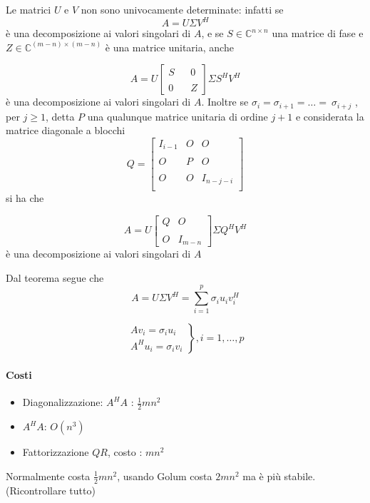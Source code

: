 \begin{thproof}
Le matrici $U$ e $V$ non sono univocamente determinate: infatti se
$$ A = U \Sigma V^{H}$$
\`e una decomposizione ai valori singolari di $A$, e se $S \in
\mathbb{C}^{n \times n}$ una matrice di fase e $Z \in
\mathbb{C}^{(m-n) \times (m-n)}$ \`e una matrice unitaria, anche

$$
A = U \left[
\begin{array}{ccc} S & & 0\\ & & \\ 0 & & Z
\end{array} \right] \Sigma S^{H}V^{H}
$$
\`e una decomposizione ai valori singolari di $A$.  Inoltre se
$\sigma_i = \sigma_{i+1} = \ldots = \ \sigma_{i+j}$ , per $j \geq 1$,
detta $P$ una qualunque matrice unitaria di ordine $j + 1$ e
considerata la matrice diagonale a blocchi
$$
Q= \left[
\begin{array}{ccc} I_{i-1} & O & O \\ & & \\ O & P & O \\ & & \\ O & O
& I_{n-j-i} \\
\end{array} \right]
$$
si ha che

$$
A= U \left[
\begin{array}{cc} Q & O \\ & \\ O & I_{m-n}
\end{array} \right] \Sigma Q^{H}V^{H}
$$
\`e una decomposizione ai valori singolari di $A$
\end{thproof} Dal teorema segue che
\begin{equation}
  \label{eq:06minq13} A = U\Sigma V^{H} = \displaystyle \sum_{i=1}^{p}
\sigma_i u_i v_i^{H}
\end{equation}

$$
\left.
\begin{array}{c} Av_i = \sigma_i u_i \\ A^{H} u_i = \sigma_i v_i
\end{array} \right\}, i=1,\ldots, p
$$
\begin{workinprogress}
\paragraph{Costi}
\begin{itemize}
 \item  Diagonalizzazione: $A^{H}A$ : $\frac{1}{2}mn^{2}$
 \item $A^{H}A$: $O(n^{3})$
 \item  Fattorizzazione $QR$, costo : $mn^{2}$
\end{itemize}
Normalmente costa $\frac{1}{2} mn^{2}$, usando Golum costa $2mn^{2}$
ma \`e più stabile. (Ricontrollare tutto)  
\end{workinprogress}

